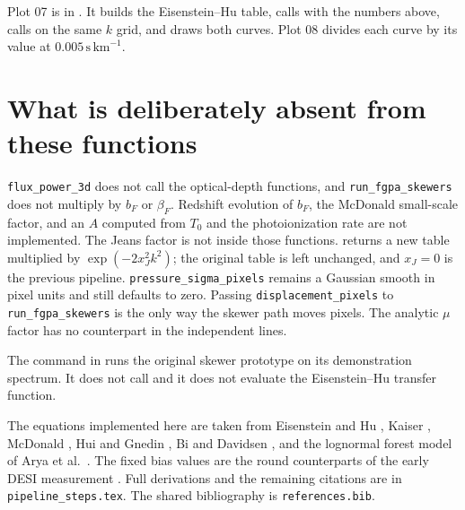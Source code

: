 \documentclass[11pt]{article}
\begin{document}
Plot 07 is  in . It builds the Eisenstein--Hu table, calls  with the numbers above, calls  on the same $k$ grid, and draws both curves. Plot 08 divides each curve by its value at $0.005\,\mathrm{s\,km}^{-1}$.

\section{What is deliberately absent from these functions}

\texttt{flux\_power\_3d} does not call the optical-depth functions, and \texttt{run\_fgpa\_skewers} does not multiply by $b_F$ or $\beta_F$. Redshift evolution of $b_F$, the McDonald small-scale factor, and an $A$ computed from $T_0$ and the photoionization rate are not implemented. The Jeans factor is not inside those functions.  returns a new table multiplied by $\exp(-2 x_J^2 k^2)$; the original table is left unchanged, and $x_J=0$ is the previous pipeline. \texttt{pressure\_sigma\_pixels} remains a Gaussian smooth in pixel units and still defaults to zero. Passing \texttt{displacement\_pixels} to \texttt{run\_fgpa\_skewers} is the only way the skewer path moves pixels. The analytic $\mu$ factor has no counterpart in the independent lines.

The command  in  runs the original skewer prototype on its demonstration spectrum. It does not call  and it does not evaluate the Eisenstein--Hu transfer function.

The equations implemented here are taken from Eisenstein and Hu \cite{Eisenstein:1997ik}, Kaiser \cite{Kaiser:1987qv}, McDonald \cite{McDonald:2001fe}, Hui and Gnedin \cite{Hui:1997dp}, Bi and Davidsen \cite{Bi:1996fh}, and the lognormal forest model of Arya et al.\ \cite{Arya:2022uke,Arya:2023ipe}. The fixed bias values are the round counterparts of the early DESI measurement \cite{Gordon:2023dua}. Full derivations and the remaining citations are in \texttt{pipeline\_steps.tex}. The shared bibliography is \texttt{references.bib}.



\end{document}
